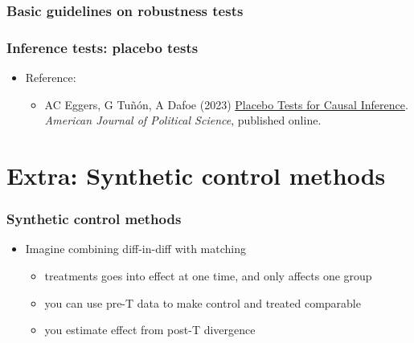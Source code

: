 \documentclass[aspectratio=43]{beamer}
\begin{document}
\begin{frame}
\frametitle{Basic guidelines on robustness tests}
\centering



\end{frame}

\begin{frame}
\frametitle{Inference tests: placebo tests}
\centering

\begin{itemize}
  \item Reference:
  \begin{itemize}
    \item AC Eggers, G Tuñón, A Dafoe (2023) \href{https://doi.org/10.1111/ajps.12818}{Placebo Tests for Causal Inference}. \textit{American Journal of Political Science}, published online.
  \end{itemize}
\end{itemize}

\end{frame}






\section{Extra: Synthetic control methods}

\begin{frame}
\frametitle{Synthetic control methods}
\centering

\begin{itemize}
  \item Imagine combining diff-in-diff with matching
  \begin{itemize}
    \item treatments goes into effect at one time, and only affects one group
    \item you can use pre-T data to make control and treated comparable
    \item you estimate effect from post-T divergence
  \end{itemize}
\end{itemize}

\end{frame}
\end{document}
